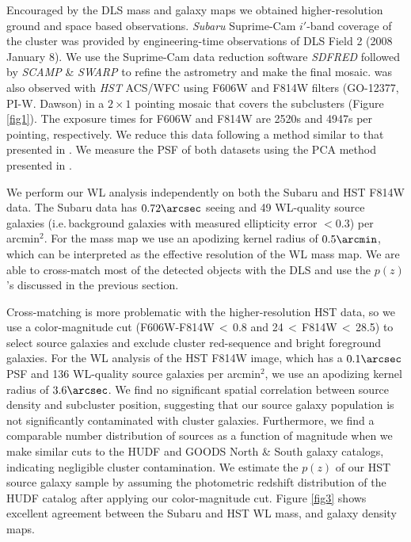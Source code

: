 Encouraged by the DLS mass and galaxy maps we obtained higher-resolution ground and space based observations.
{\it Subaru} Suprime-Cam $i'$-band coverage of the cluster was provided by engineering-time observations of DLS Field 2 (2008 January 8).
We use the Suprime-Cam data reduction software \emph{SDFRED} \citep{yagi02,ouch04} followed by \emph{SCAMP} \& \emph{SWARP} \citep{bert02,bert06} to refine the astrometry and make the final mosaic. 
 was also observed with {\it HST} ACS/WFC using F606W and F814W filters (GO-12377, PI-W. Dawson) in a $2\times1$ pointing mosaic that covers the subclusters (Figure \ref{fig1}). 
The exposure times for F606W and F814W are 2520s and 4947s per pointing, respectively.  
We reduce this data following a method similar to that presented in \citet{jee09}.  
We measure the PSF of both datasets using the PCA method presented in \citet{jee07}.

We perform our WL analysis independently on both the Subaru and HST F814W data. The Subaru data has $0.72\arcsec$ seeing and 49 WL-quality source galaxies (i.e.\,background galaxies with measured ellipticity error  $<0.3$) per arcmin$^2$. For the mass map we use an apodizing kernel radius of $0.5\arcmin$, which can be interpreted as the effective resolution of the WL mass map.
We are able to cross-match most of the detected objects with the DLS and use the $p(z)$'s discussed in the previous section.

Cross-matching is more problematic with the higher-resolution HST data, so we use a color-magnitude cut (F606W-F814W\,$<$\,0.8 and 24\,$<$\,F814W\,$<$\,28.5) to select source galaxies and exclude cluster red-sequence and bright foreground galaxies.
For the WL analysis of the HST F814W image, which has a $0.1\arcsec$ PSF and 136 WL-quality source galaxies per arcmin$^{2}$, we use an  apodizing kernel radius of $3.6\arcsec$.
We find no significant spatial correlation between source density and subcluster position, suggesting that our source galaxy population is not significantly contaminated with cluster galaxies.
Furthermore, we find a comparable number distribution of sources as a function of magnitude when we make similar cuts to the HUDF \citep{coe06} and GOODS North \& South \citep{giav04} galaxy catalogs, indicating negligible cluster contamination.
We estimate the $p(z)$ of our HST source galaxy sample by assuming the photometric redshift distribution of the \citet{coe06} HUDF catalog after applying our color-magnitude cut.
Figure \ref{fig3} shows excellent agreement between the Subaru and HST WL mass, and galaxy density maps.

